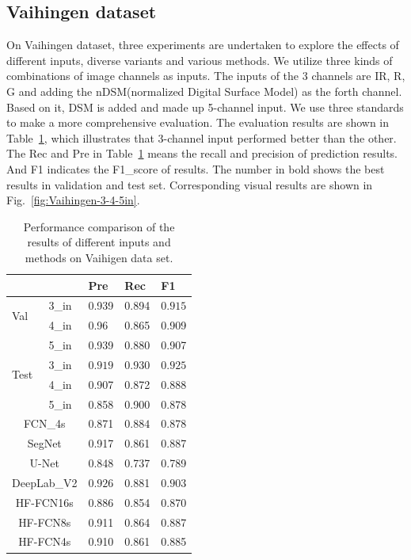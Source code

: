 \subsection{Vaihingen dataset}
On Vaihingen dataset, three experiments are undertaken to explore the effects of different inputs, diverse variants and various methods. We utilize three kinds of combinations of image channels as inputs. The inputs of the 3 channels are IR, R, G and adding the nDSM(normalized Digital Surface Model) as the forth channel. Based on it, DSM is added and made up 5-channel input. We use three standards to make a more comprehensive evaluation. The evaluation results are shown in Table~\ref{table:vaihigen-3-4-5in-comp}, which illustrates that 3-channel input performed better than the other. The Rec and Pre in Table~\ref{table:vaihigen-3-4-5in-comp} means the recall and precision of prediction results. And F1 indicates the F1\_score of results. The number in bold shows the best results in validation and test set. Corresponding visual results are shown in Fig.~\ref{fig:Vaihingen-3-4-5in}.



\begin{table}[htbp]
\caption {Performance comparison of the results of different inputs and methods on Vaihigen data set. }
\label{table:vaihigen-3-4-5in-comp}
\centering
\begin{tabular}{p{0.5cm}<{\centering}|p{1.1cm}<{\centering}|p{1.1cm}<{\centering}|p{1.1cm}<{\centering}|p{1.1cm}<{\centering}}
\hline
&&Pre&Rec&F1\\
\hline
\multirow{2}{*}{Val}&3\_in&0.939&0.894&$\bm{0.915}$\\
&4\_in&0.96&0.865&0.909\\
&5\_in&0.939&0.880&0.907\\
\hline
\multirow{2}{*}{Test}&3\_in&$\bm{0.919}$&$\bm{0.930}$&$\bm{0.925}$\\
&4\_in&0.907&0.872&0.888\\
&5\_in&0.858&0.900&0.878\\
\hline\hline
\multicolumn{2}{c|}{FCN\_4s\cite{IEEEexample:Long_2015_CVPR}}&{0.871}&$\bm{0.884}$&{0.878}\\
\multicolumn{2}{c|}{SegNet\cite{IEEEexample:badrinarayanan2017segnet}}&{0.917}&{0.861}&{0.887}\\
\multicolumn{2}{c|}{U-Net\cite{IEEEexample:ronneberger2015u}}&{0.848}&{0.737}&{0.789}\\
\multicolumn{2}{c|}{DeepLab\_V2\cite{IEEEexample:chen2016deeplab}}&$\bm{0.926}$&{0.881}&$\bm{0.903}$\\
\hline \hline
\multicolumn{2}{c|}{HF-FCN16s}&{0.886}&{0.854}&{0.870}\\
\multicolumn{2}{c|}{HF-FCN8s}&{0.911}&{0.864}&{0.887}\\
\multicolumn{2}{c|}{HF-FCN4s}&{0.910}&{0.861}&{0.885}\\
\hline
\end{tabular}
\end{table}

